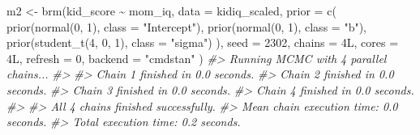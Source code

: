 \documentclass[
  10pt,
  italian,
  a4paper,
  extrafontsizes,onecolumn,openright
  ]{memoir}
\newenvironment{Shaded}{\begin{snugshade}}{\end{snugshade}}
\newcommand{\AttributeTok}[1]{\textcolor[rgb]{0.77,0.63,0.00}{#1}}
\newcommand{\CommentTok}[1]{\textcolor[rgb]{0.56,0.35,0.01}{\textit{#1}}}
\newcommand{\DecValTok}[1]{\textcolor[rgb]{0.00,0.00,0.81}{#1}}
\newcommand{\FunctionTok}[1]{\textcolor[rgb]{0.00,0.00,0.00}{#1}}
\newcommand{\NormalTok}[1]{#1}
\newcommand{\OtherTok}[1]{\textcolor[rgb]{0.56,0.35,0.01}{#1}}
\newcommand{\SpecialCharTok}[1]{\textcolor[rgb]{0.00,0.00,0.00}{#1}}
\newcommand{\StringTok}[1]{\textcolor[rgb]{0.31,0.60,0.02}{#1}}
\theoremstyle{definition}
\theoremstyle{definition}
\theoremstyle{definition}
\theoremstyle{definition}
\theoremstyle{remark}
\begin{document}
\begin{Shaded}
\begin{Highlighting}[]
\NormalTok{m2 }\OtherTok{\textless{}{-}} \FunctionTok{brm}\NormalTok{(kid\_score }\SpecialCharTok{\textasciitilde{}}\NormalTok{ mom\_iq,}
  \AttributeTok{data =}\NormalTok{ kidiq\_scaled,}
  \AttributeTok{prior =} \FunctionTok{c}\NormalTok{(}
    \FunctionTok{prior}\NormalTok{(}\FunctionTok{normal}\NormalTok{(}\DecValTok{0}\NormalTok{, }\DecValTok{1}\NormalTok{), }\AttributeTok{class =} \StringTok{"Intercept"}\NormalTok{),}
    \FunctionTok{prior}\NormalTok{(}\FunctionTok{normal}\NormalTok{(}\DecValTok{0}\NormalTok{, }\DecValTok{1}\NormalTok{), }\AttributeTok{class =} \StringTok{"b"}\NormalTok{),}
    \FunctionTok{prior}\NormalTok{(}\FunctionTok{student\_t}\NormalTok{(}\DecValTok{4}\NormalTok{, }\DecValTok{0}\NormalTok{, }\DecValTok{1}\NormalTok{), }\AttributeTok{class =} \StringTok{"sigma"}\NormalTok{)}
\NormalTok{  ),}
  \AttributeTok{seed =} \DecValTok{2302}\NormalTok{,}
  \AttributeTok{chains =}\NormalTok{ 4L,}
  \AttributeTok{cores =}\NormalTok{ 4L,}
  \AttributeTok{refresh =} \DecValTok{0}\NormalTok{,}
  \AttributeTok{backend =} \StringTok{"cmdstan"}
\NormalTok{)}
\CommentTok{\#\textgreater{} Running MCMC with 4 parallel chains...}
\CommentTok{\#\textgreater{} }
\CommentTok{\#\textgreater{} Chain 1 finished in 0.0 seconds.}
\CommentTok{\#\textgreater{} Chain 2 finished in 0.0 seconds.}
\CommentTok{\#\textgreater{} Chain 3 finished in 0.0 seconds.}
\CommentTok{\#\textgreater{} Chain 4 finished in 0.0 seconds.}
\CommentTok{\#\textgreater{} }
\CommentTok{\#\textgreater{} All 4 chains finished successfully.}
\CommentTok{\#\textgreater{} Mean chain execution time: 0.0 seconds.}
\CommentTok{\#\textgreater{} Total execution time: 0.2 seconds.}
\end{Highlighting}
\end{Shaded}
\end{document}
